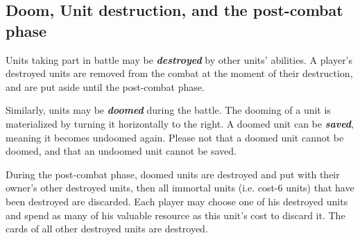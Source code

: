 \documentclass[a4paper]{article}
\begin{document}
  \subsection{Doom, Unit destruction, and the post-combat phase}
  
    Units taking part in battle may be \textbf{\textit{destroyed}} by other units' abilities.
    A player's destroyed units are removed from the combat at the moment of their destruction,
    and are put aside until the post-combat phase.
    
    Similarly, units may be \textbf{\textit{doomed}} during the battle.
    The dooming of a unit is materialized by turning it horizontally to the right.
    A doomed unit can be \textbf{\textit{saved}}, meaning it becomes undoomed again.
    Please not that a doomed unit cannot be doomed, and that an undoomed unit cannot be saved.
    
    During the post-combat phase, doomed units are destroyed and put with their owner's other
    destroyed units, then all immortal units (i.e. cost-6 units) that have been destroyed are
    discarded.
    Each player may choose one of his destroyed units and spend as many of his valuable resource as
    this unit's cost to discard it.
    The cards of all other destroyed units are destroyed.
    
    
    
\end{document}
